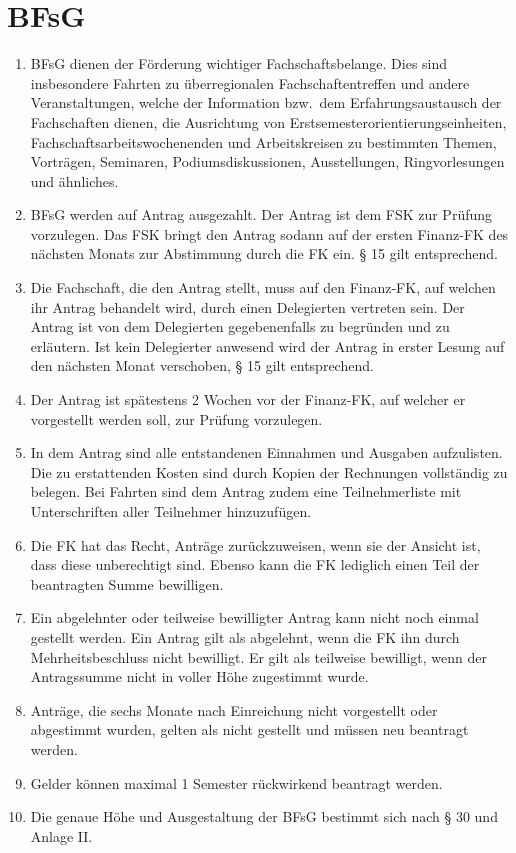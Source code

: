 \documentclass{article}
\begin{document}
\section{BFsG}
\begin{enumerate}[(1)]
    \item BFsG dienen der Förderung wichtiger Fachschaftsbelange. 
    	Dies sind insbesondere Fahrten zu überregionalen Fachschaftentreffen und andere Veranstaltungen, welche der Information bzw.\ dem Erfahrungsaustausch der Fachschaften dienen, die Ausrichtung von Erstsemesterorientierungseinheiten, Fachschaftsarbeitswochenenden und Arbeitskreisen zu bestimmten Themen, Vorträgen, Seminaren, Podiumsdiskussionen, Ausstellungen, Ringvorlesungen und ähnliches.
    \item BFsG werden auf Antrag ausgezahlt. 
    	Der Antrag ist dem FSK zur Prüfung vorzulegen. 
    	Das FSK bringt den Antrag sodann auf der ersten Finanz-FK des nächsten Monats zur Abstimmung durch die FK ein. 
    	§ 15 gilt entsprechend.
    \item Die Fachschaft, die den Antrag stellt, muss auf den Finanz-FK, auf welchen ihr Antrag behandelt wird, durch einen Delegierten vertreten sein. 
    	Der Antrag ist von dem Delegierten gegebenenfalls zu begründen und zu erläutern. 
    	Ist kein Delegierter anwesend wird der Antrag in erster Lesung auf den nächsten Monat verschoben, § 15 gilt entsprechend.
    \item Der Antrag ist spätestens 2 Wochen vor der Finanz-FK, auf welcher er vorgestellt werden soll, zur Prüfung vorzulegen. 
    \item In dem Antrag sind alle entstandenen Einnahmen und Ausgaben aufzulisten. 
    	Die zu erstattenden  Kosten sind durch Kopien der Rechnungen vollständig zu belegen. 
    	Bei Fahrten  sind dem Antrag zudem eine Teilnehmerliste mit Unterschriften aller Teilnehmer hinzuzufügen.
    \item Die FK hat das Recht, Anträge zurückzuweisen, wenn sie der Ansicht ist, dass diese unberechtigt sind. 
    	Ebenso kann die FK lediglich einen Teil der beantragten Summe bewilligen.
    \item Ein abgelehnter oder teilweise bewilligter Antrag kann nicht noch einmal gestellt werden. 
    Ein Antrag gilt als abgelehnt, wenn die FK ihn durch Mehrheitsbeschluss nicht bewilligt. 
    Er gilt als teilweise bewilligt, wenn der Antragssumme nicht in voller Höhe zugestimmt wurde.
    \item Anträge, die sechs Monate nach Einreichung nicht vorgestellt oder abgestimmt wurden, gelten als nicht gestellt und müssen neu beantragt werden.
    \item Gelder können maximal 1 Semester rückwirkend beantragt werden.
    \item Die genaue Höhe und Ausgestaltung der BFsG bestimmt sich nach § 30 und Anlage II.
\end{enumerate}
\end{document}
